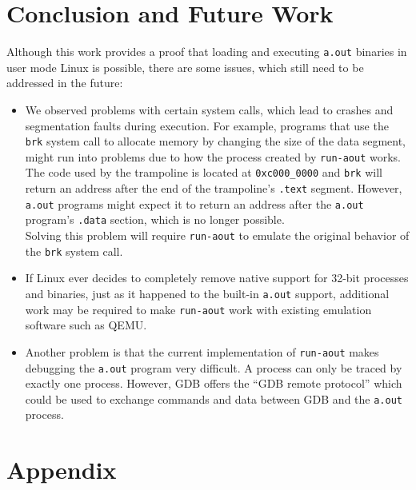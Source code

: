 \documentclass[draft,final]{vutinfth} %
\begin{document}
\chapter{Conclusion and Future Work}

Although this work provides a proof that loading and executing \texttt{a.out} binaries in user mode Linux is possible, there are some issues, which still need to be addressed in the future:

\begin{itemize}
    \item We observed problems with certain system calls, which lead to crashes and segmentation faults during execution. For example, programs that use the \texttt{brk} system call to allocate memory by changing the size of the data segment, might run into problems due to how the process created by \texttt{run-aout} works.\\
    The code used by the trampoline is located at \texttt{0xc000\_0000} and \texttt{brk} will return an address after the end of the trampoline's \texttt{.text} segment. However, \texttt{a.out} programs might expect it to return an address after the \texttt{a.out} program's \texttt{.data} section, which is no longer possible.\\
    Solving this problem will require \texttt{run-aout} to emulate the original behavior of the \texttt{brk} system call.
    
    \item If Linux ever decides to completely remove native support for 32-bit processes and binaries, just as it happened to the built-in \texttt{a.out} support, additional work may be required to make \texttt{run-aout} work with existing emulation software such as QEMU.
    
    \item Another problem is that the current implementation of \texttt{run-aout} makes debugging the \texttt{a.out} program very difficult. A process can only be traced by exactly one process. However, GDB offers the ``GDB remote protocol'' \cite{GDBRemoteProtocol} which could be used to exchange commands and data between GDB and the \texttt{a.out} process.
\end{itemize}

\newpage
\printbibliography

\newpage
\listoffigures

\listoftables

\lstlistoflistings

\newpage
\chapter*{Appendix}
\end{document}

